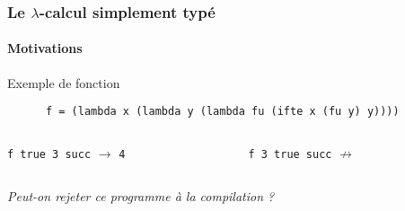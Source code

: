 \documentclass{beamer}
\begin{document}
\begin{frame}[b,fragile]
\frametitle{Le $\lambda$-calcul simplement typé}
\framesubtitle{Motivations} 

\begin{block}{Exemple de fonction}
  \begin{minipage}{.5\linewidth}
    \begin{lstlisting}
      f = (lambda x (lambda y (lambda fu (ifte x (fu y) y))))
    \end{lstlisting}
  \end{minipage}
\end{block}


\vfill

\begin{columns}
  \begin{column}{.3\linewidth}
    \lstinline!f true 3 succ! $\rightarrow$ \lstinline!4!
  \end{column}
  \begin{column}{.3\linewidth}
    \lstinline!f 3 true succ! $\not\rightarrow$
  \end{column}
\end{columns}


\vfill

\begin{flushright}
  \large{\textit{Peut-on rejeter ce programme à la compilation ?}}
\end{flushright}


\end{frame}
\end{document}
